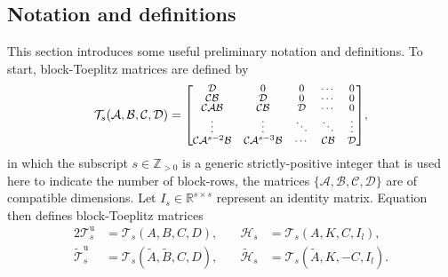 \subsection{Notation and definitions}\label{sec:notation}
This section introduces some useful preliminary notation and definitions.
%
To start, block-Toeplitz matrices are defined by
\begin{align}\label{eqn:blockToeplitz} 
\mathcal{T}_s(\mathcal{A},\mathcal{B},\mathcal{C},\mathcal{D}) =\scriptsize{
	\begingroup
    \renewcommand*{\arraystretch}{0.8}
    \begin{bmatrix}
		\mathcal{D}         & 0         & 0      & \cdots  & 0\\
		\mathcal{C}\mathcal{B}        & \mathcal{D}         & 0      & \cdots  & 0\\
		\mathcal{C}\mathcal{A}\mathcal{B}       & \mathcal{C}\mathcal{B}        & \mathcal{D}      & \cdots & 0\\
		\vdots    &  \vdots & \ddots & \ddots & \vdots\\
		\mathcal{C}\mathcal{A}^{s-2}\mathcal{B} & \mathcal{C}\mathcal{A}^{s-3}\mathcal{B} & \cdots  & \mathcal{C}\mathcal{B}     & \mathcal{D}
	\end{bmatrix}
    \endgroup},
\end{align}
in which the subscript $s\in\mathbb{Z}_{>0}$ is a generic strictly-positive integer that is used here to indicate the number of block-rows, the matrices $\{\mathcal{A},\mathcal{B},\mathcal{C},\mathcal{D}\}$ are of compatible dimensions. Let ${I_s\in\mathbb{R}^{s\times s}}$ represent an identity matrix. Equation~ then defines block-Toeplitz matrices
\begin{alignat*}{2}
\mathcal{T}_s^\mathrm{u}&=\mathcal{T}_s(A,B,C,D),\quad  &\mathcal{H}_s&=\mathcal{T}_s(A,K,C,I_l),\\
\widetilde{\mathcal{T}}_s^\mathrm{u}&=\mathcal{T}_s(\tilde{A},\tilde{B},C,D),\quad  &\widetilde{\mathcal{H}}_s&=\mathcal{T}_s(\tilde{A},K,-C,I_l).
\end{alignat*}

